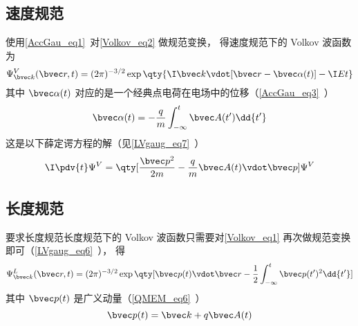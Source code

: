 \subsection{速度规范}
使用\autoref{AccGau_eq1}~对\autoref{Volkov_eq2} 做规范变换， 得速度规范下的 Volkov 波函数为
\begin{equation}\label{Volkov_eq1}
\Psi_{\bvec k}^V(\bvec r, t) = (2\pi)^{-3/2} \exp\qty{\I \bvec k \vdot [\bvec r - \bvec \alpha(t)] - \I Et}
\end{equation}
其中 $\bvec \alpha(t)$ 对应的是一个经典点电荷在电场中的位移（\autoref{AccGau_eq3}~）
\begin{equation}
\bvec \alpha(t) = -\frac{q}{m} \int_{-\infty}^t \bvec A(t') \dd{t'}
\end{equation}
这是以下薛定谔方程的解（见\autoref{LVgaug_eq7}~）
\begin{equation}
\I \pdv{t} \Psi^V = \qty[\frac{\bvec p^2}{2m} - \frac{q}{m}\bvec A(t) \vdot \bvec p] \Psi^V
\end{equation}

\subsection{长度规范}
要求长度规范长度规范下的 Volkov 波函数只需要对\autoref{Volkov_eq1} 再次做规范变换即可（\autoref{LVgaug_eq6}~）， 得
\begin{equation}
\Psi_{\bvec k}^L(\bvec r, t) = (2\pi)^{-3/2} \exp\qty[\bvec p(t)\vdot \bvec r - \frac{1}{2}\int_{-\infty}^t \bvec p(t')^2 \dd{t'}]
\end{equation}
其中 $\bvec p(t)$ 是广义动量（\autoref{QMEM_eq6}~）
\begin{equation}
\bvec p(t) = \bvec k + q\bvec A(t)
\end{equation}
